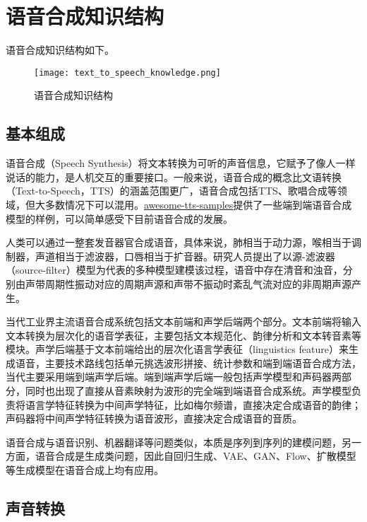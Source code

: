 \documentclass[cn,10pt,math=newtx,citestyle=gb7714-2015,bibstyle=gb7714-2015]{elegantbook}
\begin{document}
\chapter{语音合成知识结构}

语音合成知识结构如下。

\begin{figure}[htbp]
  \centering
  \texttt{[image: text\_to\_speech\_knowledge.png]}
  \caption{语音合成知识结构 \label{fig:text_to_speech_knowledge}}
\end{figure}

\section{基本组成}

语音合成（Speech Synthesis）将文本转换为可听的声音信息，它赋予了像人一样说话的能力，是人机交互的重要接口。一般来说，语音合成的概念比文语转换（Text-to-Speech，TTS）的涵盖范围更广，语音合成包括TTS、歌唱合成等领域，但大多数情况下可以混用。\href{https://github.com/seungwonpark/awesome-tts-samples}{awesome-tts-samples}提供了一些端到端语音合成模型的样例，可以简单感受下目前语音合成的发展。

人类可以通过一整套发音器官合成语音，具体来说，肺相当于动力源，喉相当于调制器，声道相当于滤波器，口唇相当于扩音器。研究人员提出了以源-滤波器（source-filter）模型为代表的多种模型建模该过程，语音中存在清音和浊音，分别由声带周期性振动对应的周期声源和声带不振动时紊乱气流对应的非周期声源产生。

当代工业界主流语音合成系统包括文本前端和声学后端两个部分。文本前端将输入文本转换为层次化的语音学表征，主要包括文本规范化、韵律分析和文本转音素等模块。声学后端基于文本前端给出的层次化语言学表征（linguistics feature）来生成语音，主要技术路线包括单元挑选波形拼接、统计参数和端到端语音合成方法，当代主要采用端到端声学后端。端到端声学后端一般包括声学模型和声码器两部分，同时也出现了直接从音素映射为波形的完全端到端语音合成系统。声学模型负责将语言学特征转换为中间声学特征，比如梅尔频谱，直接决定合成语音的韵律；声码器将中间声学特征转换为语音波形，直接决定合成语音的音质。

语音合成与语音识别、机器翻译等问题类似，本质是序列到序列的建模问题，另一方面，语音合成是生成类问题，因此自回归生成、VAE、GAN、Flow、扩散模型等生成模型在语音合成上均有应用。

\section{声音转换}
\end{document}

